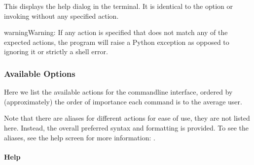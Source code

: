 \documentclass[letterpaper,11pt,english]{sphinxmanual}
\begin{document}
\sphinxAtStartPar
This displays the help dialog in the terminal. It is identical to the
{\hyperref[\detokenize{user/command_line:cmdoption-help}]{}} option or invoking  without any
specified action.

\begin{sphinxadmonition}{warning}{Warning:}
\sphinxAtStartPar
If any action is specified that does not match any of the expected actions,
the program will raise a Python exception as opposed to ignoring it or
strictly a shell error.
\end{sphinxadmonition}


\subsubsection{Available Options}
\label{\detokenize{user/command_line:available-options}}\label{\detokenize{user/command_line:user-command-line-available-options}}

\begin{savenotes}\begin{fulllineitems}
\label{\detokenize{user/command_line:cmdoption-arg-options}}
\pysigstartsignatures
\pysigline{\sphinxbfcode{\sphinxupquote{{[}options{]}}}\sphinxcode{\sphinxupquote{}}}
\pysigstopsignatures
\end{fulllineitems}\end{savenotes}


\sphinxAtStartPar
Here we list the available actions for the command\sphinxhyphen{}line interface, ordered by
(approximately) the order of importance each command is to the average user.

\sphinxAtStartPar
Note that there are aliases for different actions for ease of use, they
are not listed here. Instead, the overall preferred syntax and formatting
is provided. To see the aliases, see the help screen for more information:
{\hyperref[\detokenize{user/command_line:user-command-line-available-actions-help}]{}}.


\paragraph{Help}
\label{\detokenize{user/command_line:id1}}
\end{document}
